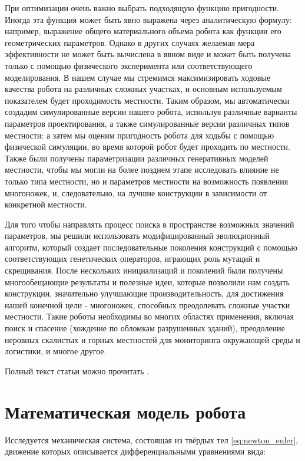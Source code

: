 При оптимизации очень важно выбрать подходящую функцию пригодности. Иногда эта функция может быть явно выражена через аналитическую формулу: например, выражение общего материального объема робота как функции его геометрических параметров. Однако в других случаях желаемая мера эффективности не может быть вычислена в явном виде и может быть получена только с помощью физического эксперимента или соответствующего моделирования. В нашем случае мы стремимся максимизировать ходовые качества робота на различных сложных участках, и основным используемым показателем будет проходимость местности. Таким образом, мы автоматически создадим симулированные версии нашего робота, используя различные варианты параметров проектирования, а также симулированные версии различных типов местности: а затем мы оценим пригодность робота для ходьбы с помощью физической симуляции, во время которой робот будет проходить по местности. Также были получены параметризации различных генеративных моделей местности, чтобы мы могли на более позднем этапе исследовать влияние не только типа местности, но и параметров местности на возможность появления многоножек, и, следовательно, на лучшие конструкции в зависимости от конкретной местности.

Для того чтобы направлять процесс поиска в пространстве возможных значений параметров, мы решили использовать модифицированный эволюционный алгоритм, который создает последовательные поколения конструкций с помощью соответствующих генетических операторов, играющих роль мутаций и скрещивания. После нескольких инициализаций и поколений были получены многообещающие результаты и полезные идеи, которые позволили нам создать конструкции, значительно улучшающие производительность, для достижения нашей конечной цели - многоножек, способных преодолевать сложные участки местности. Такие роботы необходимы во многих областях применения, включая поиск и спасение (хождение по обломкам разрушенных зданий), преодоление неровных скалистых и горных местностей для мониторинга окружающей среды и логистики, и многое другое. 

Полный текст статьи можно прочитать \cite{bulichevOptimizationCentipedeRobot2017}.

\section*{Математическая модель робота}
Исследуется механическая система, состоящая из твёрдых тел \eqref{eq:newton_euler}, движение которых описывается дифференциальными уравнениями вида:

